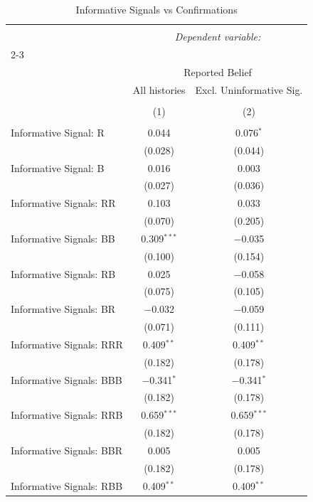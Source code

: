 
\begin{table}[!htbp] \centering 
  \caption{Informative Signals vs Confirmations} 
  \label{} 
\begin{tabular}{@{\extracolsep{5pt}}lcc} 
\\[-1.8ex]\hline 
\hline \\[-1.8ex] 
 & \multicolumn{2}{c}{\textit{Dependent variable:}} \\ 
\cline{2-3} 
\\[-1.8ex] & \multicolumn{2}{c}{Reported Belief} \\ 
 & All histories & Excl. Uninformative Sig. \\ 
\\[-1.8ex] & (1) & (2)\\ 
\hline \\[-1.8ex] 
 Informative Signal: R & 0.044 & 0.076$^{*}$ \\ 
  & (0.028) & (0.044) \\ 
  Informative Signal: B & 0.016 & 0.003 \\ 
  & (0.027) & (0.036) \\ 
  Informative Signals: RR & 0.103 & 0.033 \\ 
  & (0.070) & (0.205) \\ 
  Informative Signals: BB & 0.309$^{***}$ & $-$0.035 \\ 
  & (0.100) & (0.154) \\ 
  Informative Signals: RB & 0.025 & $-$0.058 \\ 
  & (0.075) & (0.105) \\ 
  Informative Signals: BR & $-$0.032 & $-$0.059 \\ 
  & (0.071) & (0.111) \\ 
  Informative Signals: RRR & 0.409$^{**}$ & 0.409$^{**}$ \\ 
  & (0.182) & (0.178) \\ 
  Informative Signals: BBB & $-$0.341$^{*}$ & $-$0.341$^{*}$ \\ 
  & (0.182) & (0.178) \\ 
  Informative Signals: RRB & 0.659$^{***}$ & 0.659$^{***}$ \\ 
  & (0.182) & (0.178) \\ 
  Informative Signals: BBR & 0.005 & 0.005 \\ 
  & (0.182) & (0.178) \\ 
  Informative Signals: RBB & 0.409$^{**}$ & 0.409$^{**}$ \\ 

\end{tabular}
\end{table}
